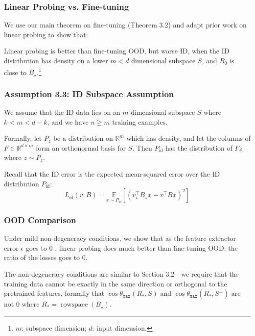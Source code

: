\documentclass[16pt,aspectratio=169]{beamer}
\begin{document}
\begin{frame}
    \frametitle{Linear Probing vs. Fine-tuning}

    We use our main theorem on fine-tuning (Theorem 3.2) and adapt prior work on linear probing to show that:
    
    Linear probing is better than fine-tuning OOD, but worse ID, when the ID distribution has density on a lower $m < d$ dimensional subspace $S$, and $B_0$ is close to $B_\star$.\footnote{$m$: subspace dimension; $d$: input dimension.}

\end{frame}

\begin{frame}
    \frametitle{Assumption 3.3: ID Subspace Assumption}

    We assume that the ID data lies on an $m$-dimensional subspace $S$ where $k<m<d-k$, and we have $n \geq m$ training examples.
 
    Formally, let $P_z$ be a distribution on $\mathbb{R}^m$ which has density, and let the columns of $F \in \mathbb{R}^{d \times m}$ form an orthonormal basis for $S$. Then $P_{\text {id}}$ has the distribution of $F z$ where $z \sim P_z$.

    Recall that the ID error is the expected mean-squared error over the ID distribution $P_{\text {id}}$:
    \begin{equation}
        L_{\text{id}}(v, B)=\underset{x \sim P_{\text {id}}}{\mathbb{E}}\left[\left(v_{\star}^{\top} B_{\star} x-v^{\top} B x\right)^2\right]
    \end{equation}

\end{frame}

\begin{frame}
    \frametitle{OOD Comparison}

    Under mild non-degeneracy conditions, we show that as the feature extractor error $\epsilon$ goes to $0$ , linear probing does much better than fine-tuning OOD: the ratio of the losses goes to $0$.

    The non-degeneracy conditions are similar to Section 3.2---we require that the training data cannot be exactly in the same direction or orthogonal to the pretrained features, formally that $\cos \theta_{\mathtt{max}}\left(R_*, S\right)$ and $\cos \theta_{\mathtt{max}}\left(R_*, S^{\perp}\right)$ are not $0$ where $R_*=\operatorname{rowspace}\left(B_{\star}\right)$.

\end{frame}
\end{document}
